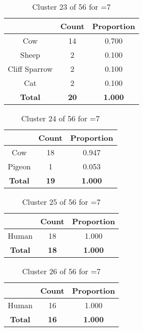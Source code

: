 \begin{table}[ht!]
\centering
\begin{tabular}{|c|c|c|}
\hline
\bf \Spec{} &\bf Count &\bf Proportion\\ \hline \hline
Cow & 14 & 0.700\\ \hline
Sheep & 2 & 0.100\\ \hline
Cliff Sparrow & 2 & 0.100\\ \hline
Cat & 2 & 0.100\\ \hline
\hline
\bf Total & \bf 20 & \bf 1.000\\ \hline
\end{tabular}
\label{tab:cluster:23:7}
\caption{Cluster 23 of 56 for \minneigh{}=7}
\end{table}

\begin{table}[ht!]
\centering
\begin{tabular}{|c|c|c|}
\hline
\bf \Spec{} &\bf Count &\bf Proportion\\ \hline \hline
Cow & 18 & 0.947\\ \hline
Pigeon & 1 & 0.053\\ \hline
\hline
\bf Total & \bf 19 & \bf 1.000\\ \hline
\end{tabular}
\label{tab:cluster:24:7}
\caption{Cluster 24 of 56 for \minneigh{}=7}
\end{table}

\begin{table}[ht!]
\centering
\begin{tabular}{|c|c|c|}
\hline
\bf \Spec{} &\bf Count &\bf Proportion\\ \hline \hline
Human & 18 & 1.000\\ \hline
\hline
\bf Total & \bf 18 & \bf 1.000\\ \hline
\end{tabular}
\label{tab:cluster:25:7}
\caption{Cluster 25 of 56 for \minneigh{}=7}
\end{table}

\begin{table}[ht!]
\centering
\begin{tabular}{|c|c|c|}
\hline
\bf \Spec{} &\bf Count &\bf Proportion\\ \hline \hline
Human & 16 & 1.000\\ \hline
\hline
\bf Total & \bf 16 & \bf 1.000\\ \hline
\end{tabular}
\label{tab:cluster:26:7}
\caption{Cluster 26 of 56 for \minneigh{}=7}
\end{table}

